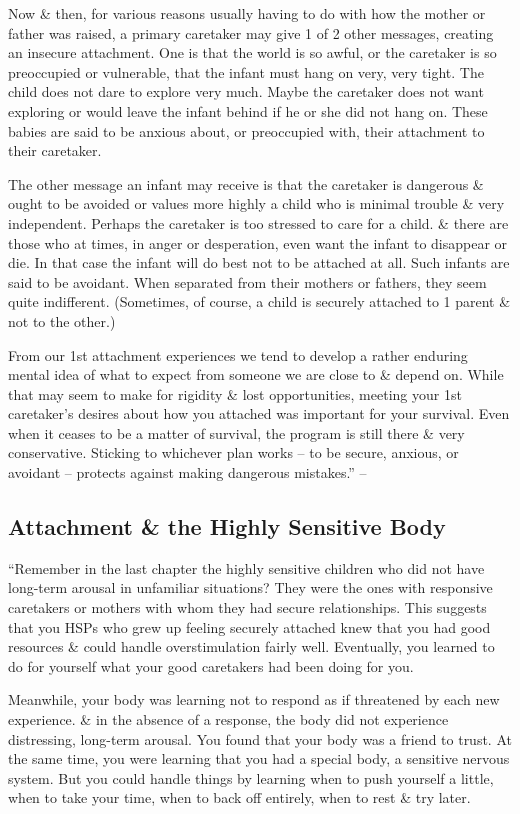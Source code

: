 \documentclass{article}
\numberwithin{equation}{section}
\begin{document}
Now \& then, for various reasons usually having to do with how the mother or father was raised, a primary caretaker may give 1 of 2 other messages, creating an insecure attachment. One is that the world is so awful, or the caretaker is so preoccupied or vulnerable, that the infant must hang on very, very tight. The child does not dare to explore very much. Maybe the caretaker does not want exploring or would leave the infant behind if he or she did not hang on. These babies are said to be anxious about, or preoccupied with, their attachment to their caretaker.

The other message an infant may receive is that the caretaker is dangerous \& ought to be avoided or values more highly a child who is minimal trouble \& very independent. Perhaps the caretaker is too stressed to care for a child. \& there are those who at times, in anger or desperation, even want the infant to disappear or die. In that case the infant will do best not to be attached at all. Such infants are said to be avoidant. When separated from their mothers or fathers, they seem quite indifferent. (Sometimes, of course, a child is securely attached to 1 parent \& not to the other.)

From our 1st attachment experiences we tend to develop a rather enduring mental idea of what to expect from someone we are close to \& depend on. While that may seem to make for rigidity \& lost opportunities, meeting your 1st caretaker's desires about how you attached was important for your survival. Even when it ceases to be a matter of survival, the program is still there \& very conservative. Sticking to whichever plan works -- to be secure, anxious, or avoidant -- protects against making dangerous mistakes.'' -- \cite[pp. 77--78]{Aron2013}

\subsection{Attachment \& the Highly Sensitive Body}
``Remember in the last chapter the highly sensitive children who did not have long-term arousal in unfamiliar situations? They were the ones with responsive caretakers or mothers with whom they had secure relationships. This suggests that you HSPs who grew up feeling securely attached knew that you had good resources \& could handle overstimulation fairly well. Eventually, you learned to do for yourself what your good caretakers had been doing for you.

Meanwhile, your body was learning not to respond as if threatened by each new experience. \& in the absence of a response, the body did not experience distressing, long-term arousal. You found that your body was a friend to trust. At the same time, you were learning that you had a special body, a sensitive nervous system. But you could handle things by learning when to push yourself a little, when to take your time, when to back off entirely, when to rest \& try later.
\end{document}
